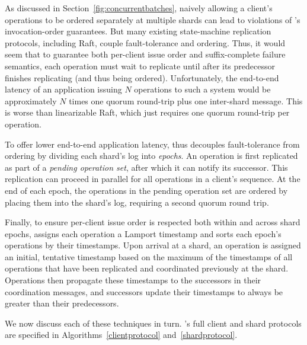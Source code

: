 
As discussed in Section~\ref{fig:concurrentbatches}, naively allowing
a client's operations to be ordered separately at multiple shards can lead
to violations of \MDL{}'s invocation-order guarantees. But many existing
state-machine replication protocols, including Raft, couple fault-tolerance
and ordering. Thus, it would seem that to guarantee both per-client issue order
and suffix-complete failure semantics, each operation must wait to replicate
until after its predecessor finishes replicating (and thus being ordered).
Unfortunately, the end-to-end latency of an application issuing $N$ operations
to such a system would be approximately $N$ times one quorum round-trip plus
one inter-shard message. This is worse than linearizable Raft, which just requires
one quorum round-trip per operation.

To offer lower end-to-end application latency, \sys{} thus decouples
fault-tolerance from ordering by dividing each shard's log into \textit{epochs}.
An operation is first replicated as part of a \textit{pending operation set},
after which it can notify its successor. This replication can proceed in
parallel for all operations in a client's sequence. At the end of each epoch,
the operations in the pending operation set are ordered by placing them into
the shard's log, requiring a second quorum round trip.     


Finally, to ensure per-client issue order is respected both within and across
shard epochs, \sys{} assigns each operation a Lamport timestamp and sorts each
epoch's operations by their timestamps. Upon arrival at a shard, an operation
is assigned an initial, tentative timestamp based on the maximum of the timestamps of
all operations that have been replicated and coordinated previously at the shard.
Operations then propagate these timestamps to the successors in their coordination
messages, and successors update their timestamps to always be greater than their
predecessors.

We now discuss each of these techniques in turn. \sys{}'s full client and shard
protocols are specified in Algorithms~\ref{clientprotocol} and~\ref{shardprotocol}. 

